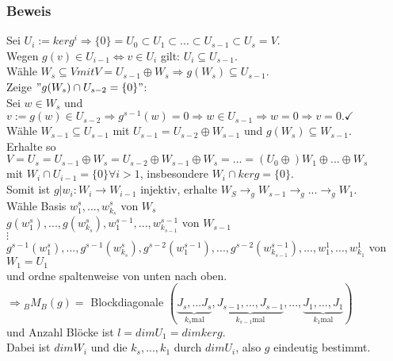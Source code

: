 \documentclass[a4paper, 12pt]{extarticle}
\begin{document}
\subsubsection*{Beweis}
Sei $U_i := kerg^i \Rightarrow \{0\} = U_0 \subset U_1 \subset ... \subset U_{s-1} \subset U_s = V$.\\
Wegen $g(v) \in U_{i-1} \Leftrightarrow v\in U_i$ gilt: $U_i \subseteq U_{s-1}$.\\
Wähle $W_s \subseteq V mit V =  U_{s-1} \oplus W_s \Rightarrow g(W_s) \subseteq U_{s-1}$.\\
Zeige $"g(W_s) \cap U_{s-2} = \{0\}"$: \\
Sei $w\in W_s$ und $v := g(w) \in U_{s-2} \Rightarrow g^{s-1}(w) = 0 \Rightarrow w\in U_{s-1} \Rightarrow w = 0 \Rightarrow v = 0.\checkmark$\\
Wähle $W_{s-1} \subseteq U_{s-1}$ mit $U_{s-1} = U_{s-2} \oplus W_{s-1}$ und $g(W_s) \subseteq W_{s-1}$.\\
Erhalte so $V = U_s = U_{s-1} \oplus W_s = U_{s-2} \oplus W_{s-1} \oplus W_s = ... = (U_0 \oplus)W_1 \oplus ... \oplus W_s$\\
mit $W_i \cap U_{i-1} = \{0\} \forall i > 1$, insbesondere $W_i \cap kerg = \{0\}$.\\
Somit ist $g|w_i : W_i \rightarrow W_{i-1}$ injektiv, erhalte $W_S \rightarrow_g W_{s-1} \rightarrow_g ... \rightarrow_g W_1$.\\
Wähle Basis $w_1^s, ... , w_{k_s}^s$ von $W_s$\\
$g(w_1^s), ..., g(w_{k_s}^s), w_1^{s-1}, ..., w_{k_{s-1}}^{s-1}$ von $W_{s-1}$\\
$\vdots$\\
$g^{s-1}(w_1^s), ... , g^{s-1}(w_{k_s}^s), g^{s-2}(w_1^{s-1}), ..., g^{s-2}(w_{k_{s-1}}^{s-1}), ..., w_1^1, ..., w_{k_1}^1$ von $W_1 = U_1$\\
und ordne spaltenweise von unten nach oben.\\
$\Rightarrow {}_BM_B(g) =$ Blockdiagonale $(\underbrace{J_s, ... J_s}_{k_s \text{mal}} , \underbrace{J_{s-1}, ... , J_{s-1}}_{k_{s-1} \text{mal}}, ..., \underbrace{J_1, ..., J_1}_{k_1 \text{mal}})$\\
und Anzahl Blöcke ist $l = dimU_1 = dimkerg$.\\
Dabei ist $dimW_i$ und die $k_s, ..., k_1$ durch $dimU_i$, also $g$ eindeutig bestimmt.\\
\end{document}
